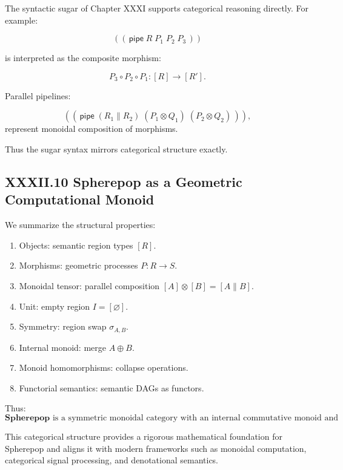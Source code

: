 \documentclass[12pt,letterpaper]{article}
\begin{document}
The syntactic sugar of Chapter XXXI supports categorical reasoning directly. For example:

\[
((\,\mathsf{pipe}\; R\; P_1\; P_2\; P_3\,))
\]

is interpreted as the composite morphism:

\[
P_3 \circ P_2 \circ P_1 : [R] \to [R'].
\]

Parallel pipelines:

\[
((\,\mathsf{pipe}\; (R_1 \parallel R_2)\; (P_1 \otimes Q_1)\; (P_2 \otimes Q_2)\,)),
\]
represent monoidal composition of morphisms.

Thus the sugar syntax mirrors categorical structure exactly.

\subsection{XXXII.10 Spherepop as a Geometric Computational Monoid}

We summarize the structural properties:

\begin{enumerate}
    \item Objects: semantic region types $[R]$.
    \item Morphisms: geometric processes $P : R \to S$.
    \item Monoidal tensor: parallel composition $[A] \otimes [B] = [A \parallel B]$.
    \item Unit: empty region $I = [\varnothing]$.
    \item Symmetry: region swap $\sigma_{A,B}$.
    \item Internal monoid: merge $A \oplus B$.
    \item Monoid homomorphisms: collapse operations.
    \item Functorial semantics: semantic DAGs as functors.
\end{enumerate}

Thus:
\[
\boxed{
\mathbf{Spherepop} \text{ is a symmetric monoidal category with an internal commutative monoid and collapse homomorphisms.}
}
\]

This categorical structure provides a rigorous mathematical foundation for Spherepop and aligns it with modern frameworks such as monoidal computation, categorical signal processing, and denotational semantics.

\end{document}
